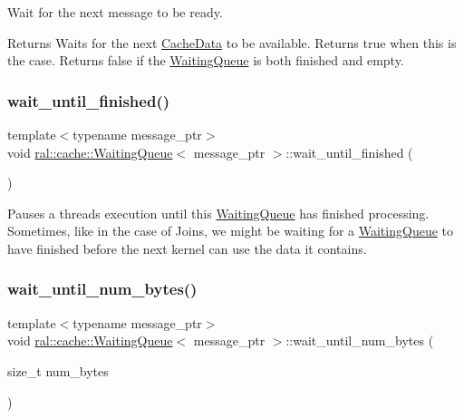 Wait for the next message to be ready. \begin{DoxyReturn}{Returns}
Waits for the next \hyperlink{classral_1_1cache_1_1CacheData}{Cache\+Data} to be available. Returns true when this is the case. Returns false if the \hyperlink{classral_1_1cache_1_1WaitingQueue}{Waiting\+Queue} is both finished and empty. 
\end{DoxyReturn}
\mbox{\label{classral_1_1cache_1_1WaitingQueue_a008f9d8254330dff1e653bd41fe43d9a}} 
\subsubsection{\texorpdfstring{wait\+\_\+until\+\_\+finished()}{wait\_until\_finished()}}
{\footnotesize\ttfamily template$<$typename message\+\_\+ptr$>$ \\
void \hyperlink{classral_1_1cache_1_1WaitingQueue}{ral\+::cache\+::\+Waiting\+Queue}$<$ message\+\_\+ptr $>$\+::wait\+\_\+until\+\_\+finished (\begin{DoxyParamCaption}{ }\end{DoxyParamCaption})\hspace{0.3cm}{\ttfamily [inline]}}

Pauses a threads execution until this \hyperlink{classral_1_1cache_1_1WaitingQueue}{Waiting\+Queue} has finished processing. Sometimes, like in the case of Joins, we might be waiting for a \hyperlink{classral_1_1cache_1_1WaitingQueue}{Waiting\+Queue} to have finished before the next kernel can use the data it contains. \mbox{\label{classral_1_1cache_1_1WaitingQueue_a84d4f711f11a11970b381b5b5c5d5662}} 
\subsubsection{\texorpdfstring{wait\+\_\+until\+\_\+num\+\_\+bytes()}{wait\_until\_num\_bytes()}}
{\footnotesize\ttfamily template$<$typename message\+\_\+ptr$>$ \\
void \hyperlink{classral_1_1cache_1_1WaitingQueue}{ral\+::cache\+::\+Waiting\+Queue}$<$ message\+\_\+ptr $>$\+::wait\+\_\+until\+\_\+num\+\_\+bytes (\begin{DoxyParamCaption}\item[{size\+\_\+t}]{num\+\_\+bytes }\end{DoxyParamCaption})\hspace{0.3cm}{\ttfamily [inline]}}

